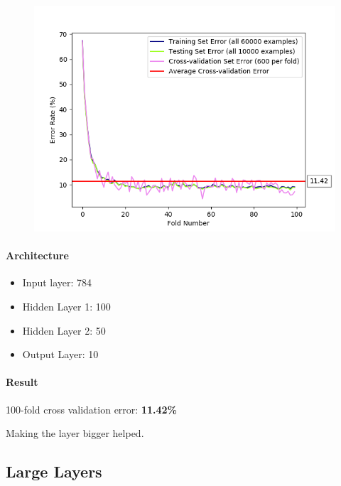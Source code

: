 \documentclass[11pt]{article}
\makeatletter
\def\maxwidth{\ifdim\Gin@nat@width>\linewidth\linewidth
    \else\Gin@nat@width\fi}
\let\Oldincludegraphics\includegraphics
\renewcommand{\includegraphics}[1]{\Oldincludegraphics[width=.8\maxwidth]{#1}}
\providecommand{\tightlist}{%
      \setlength{\itemsep}{0pt}\setlength{\parskip}{0pt}}
\makeatother
\begin{document}
\begin{figure}[htbp]
\centering
\includegraphics{plots/ff-layersize-100-50.png}
\end{figure}

\paragraph{Architecture}\label{architecture-1}

\begin{itemize}
\tightlist
\item
  Input layer: 784
\item
  Hidden Layer 1: 100
\item
  Hidden Layer 2: 50
\item
  Output Layer: 10
\end{itemize}

\paragraph{Result}\label{result-1}

100-fold cross validation error: \textbf{11.42\%}

Making the layer bigger helped.

\pagebreak

\subsection{Large Layers}\label{large-layers}
\end{document}
